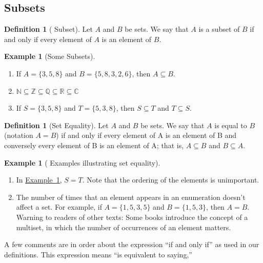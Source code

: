 \documentclass[10pt,]{book}
\theoremstyle{plain}
\theoremstyle{definition}
\newtheorem{definition}[theorem]{Definition}
\theoremstyle{definition}
\theoremstyle{definition}
\newtheorem{example}[theorem]{Example}
\theoremstyle{definition}
\begin{document}
\subsection[Subsets]{Subsets}\label{ss-subsets}
\begin{definition}[ Subset]\label{subset.}
\label{notation-4}
 Let \(A\) and \(B\) be sets. We say that \(A\) is a subset of \(B\)  if and only if every element of \(A\) is an element of \(B\). %
\end{definition}
\begin{example}[Some Subsets]\label{Some_Subsets}
\leavevmode%
\begin{enumerate}[label=\alph*]
\item\hypertarget{li-10}{} If \(A = \{3, 5, 8\}\) and \(B = \{5, 8, 3, 2, 6\}\), then \(A\subseteq B\). %
\item\hypertarget{li-11}{}  \(\mathbb{N}\subseteq \mathbb{Z}\subseteq \mathbb{Q}\subseteq \mathbb{R}\subseteq \mathbb{C}\) %
\item\hypertarget{li-12}{}If \(S = \{3, 5, 8\}\) and \(T = \{5, 3, 8\}\), then \(S \subseteq  T\) and \(T \subseteq  S\). %
\end{enumerate}
%
\end{example}
\begin{definition}[Set Equality]\label{set_equality}
Let \(A\) and \(B\) be sets. We say that \(A\) is equal to \(B\) (notation \(A = B\)) if and only if every element of
A is an element of B and conversely every element of B is an element of A; that is, \(A \subseteq  B\) and \(B \subseteq  A\).%
\end{definition}
\begin{example}[ Examples illustrating set equality]\label{set_equality_examples}
\leavevmode%
\begin{enumerate}[label=\alph*]
\item\hypertarget{li-13}{}In \hyperref[Some_Subsets]{Example~\ref{Some_Subsets}}, \(S = T\). Note that the ordering of the elements is unimportant. %
\item\hypertarget{li-14}{}The number of times that an element appears in an enumeration doesn't affect a set. For example, if \(A = \{1, 5, 3, 5\}\) and \(B = \{1, 5, 3\}\), then \(A = B\).  Warning to readers of other texts: Some books introduce the concept of a multiset, in which the number of occurrences of an element matters.%
\end{enumerate}
%
\end{example}
A few comments are in order about the expression ``if and only if'' as used in our definitions. This expression means ``is equivalent to saying,''
\end{document}
